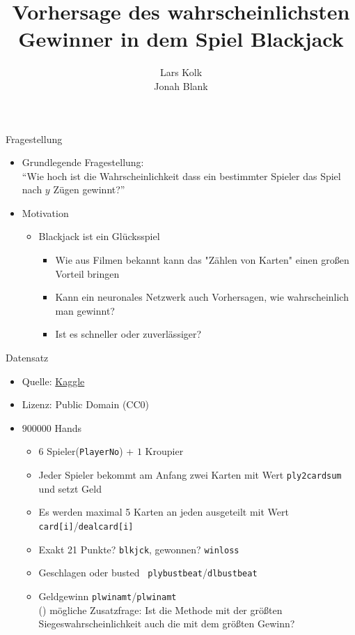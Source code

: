 \documentclass[aspectratio=1610, 9pt]{beamer}
\title{Vorhersage des wahrscheinlichsten Gewinner in dem Spiel Blackjack}
\author[L.~Kolk,~J.~Blank]{Lars Kolk\\ Jonah Blank}
\institute[ML-Seminar]{\\[0.3cm]TU Dortmund \\ \Large ML-Seminar}
\begin{document}
\maketitle


\begin{frame}{Fragestellung}
\begin{itemize}
  \item Grundlegende Fragestellung:\\
  \rightarrow{} ``Wie hoch ist die Wahrscheinlichkeit dass ein bestimmter Spieler das Spiel nach $y$ Zügen gewinnt?''
  \vspace{0.5cm}
  \item Motivation
  \begin{itemize}
    \item Blackjack ist ein Glücksspiel
    \begin{itemize}
      \item Wie aus Filmen bekannt kann das "Zählen von Karten" einen großen Vorteil bringen
      \item Kann ein neuronales Netzwerk auch Vorhersagen, wie wahrscheinlich man gewinnt?
      \item Ist es schneller oder zuverlässiger?
    \end{itemize}
  \end{itemize}
\end{itemize}
\end{frame}


\begin{frame}{Datensatz}
    \begin{itemize}
    \item Quelle: \href{https://www.kaggle.com/mojocolors/900000-hands-of-blackjack-results}{Kaggle}
    \item Lizenz: Public Domain (CC0)
    \item $900000$ Hands
    \begin{itemize}
    \item $6$ Spieler(\texttt{PlayerNo}) + $1$ Kroupier
	\item Jeder Spieler bekommt am Anfang zwei Karten mit Wert \texttt{ply2cardsum} und setzt Geld 
    \item Es werden maximal 5 Karten an jeden ausgeteilt mit Wert \texttt{card[i]}/\texttt{dealcard[i]}
    \item Exakt 21 Punkte? \texttt{blkjck}, gewonnen? \texttt{winloss}
    \item Geschlagen oder \glqq busted \grqq\, \texttt{plybustbeat}/\texttt{dlbustbeat}
    \item Geldgewinn \texttt{plwinamt}/\texttt{plwinamt}\\
    \rightarrow() mögliche Zusatzfrage: Ist die Methode mit der größten Siegeswahrscheinlichkeit auch die mit dem größten Gewinn?
    \end{itemize}
    \end{itemize}
\end{frame}
\end{document}
